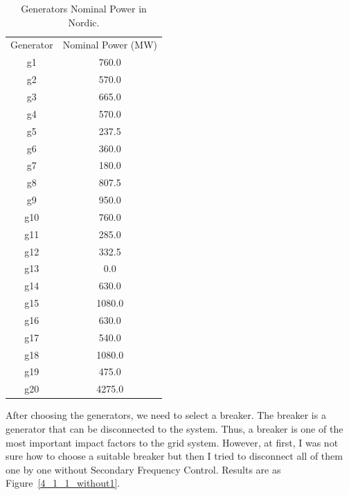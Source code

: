 \begin{table}[htbp]
\centering
\begin{tabular}{cc}
Generator & Nominal Power (MW) \\
g1        & 760.0              \\
g2        & 570.0              \\
g3        & 665.0              \\
g4        & 570.0              \\
g5        & 237.5              \\
g6        & 360.0              \\
g7        & 180.0              \\
g8        & 807.5              \\
g9        & 950.0              \\
g10       & 760.0              \\
g11       & 285.0              \\
g12       & 332.5              \\
g13       & 0.0                \\
g14       & 630.0              \\
g15       & 1080.0             \\
g16       & 630.0              \\
g17       & 540.0              \\
g18       & 1080.0             \\
g19       & 475.0              \\
g20       & 4275.0             

\end{tabular}
\caption{Generators Nominal Power in Nordic.}
\label{nominalPower}
\end{table}

After choosing the generators, we need to select a breaker. The breaker is a generator that can be disconnected to the system. Thus, a breaker is one of the most important impact factors to the grid system. However, at first, I was not sure how to choose a suitable breaker but then I tried to disconnect all of them one by one without Secondary Frequency Control. Results are as Figure~\ref{4_1_1_without1}. 

